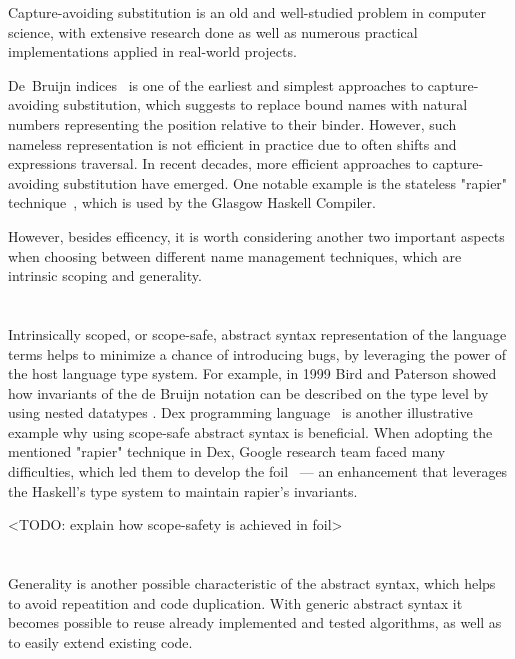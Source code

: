 Capture-avoiding substitution is an old and well-studied problem in computer science, with extensive research done as well as numerous practical implementations applied in real-world projects.

De~Bruijn indices~\cite{deBruijn1972} is one of the earliest and simplest approaches to capture-avoiding substitution, which suggests to replace bound names with natural numbers representing the position relative to their binder. However, such nameless representation is not efficient in practice due to often shifts and expressions traversal. In recent decades, more efficient approaches to capture-avoiding substitution have emerged. One notable example is the stateless "rapier" technique~\cite{Simon2002_SecretsGHC}, which is used by the Glasgow Haskell Compiler.

However, besides efficency, it is worth considering another two important aspects when choosing between different name management techniques, which are intrinsic scoping and generality.

\section{}

Intrinsically scoped, or scope-safe, abstract syntax representation of the language terms helps to minimize a chance of introducing bugs, by leveraging the power of the host language type system. For example, in 1999 Bird and Paterson \cite{BirdPaterson1999_BruijnNested} showed how invariants of the de Bruijn notation can be described on the type level by using nested datatypes \cite{Bird1998_NestedDatatypes}. Dex programming language~\cite{PaszkeDex_2021} is another illustrative example why using scope-safe abstract syntax is beneficial. When adopting the mentioned "rapier" technique in Dex, Google research team faced many difficulties, which led them to develop the foil~\cite{Foil} — an enhancement that leverages the Haskell's type system to maintain rapier's invariants.

<TODO: explain how scope-safety is achieved in foil>

\section{}

Generality is another possible characteristic of the abstract syntax, which helps to avoid repeatition and code duplication. With generic abstract syntax it becomes possible to reuse already implemented and tested algorithms, as well as to easily extend existing code. 

